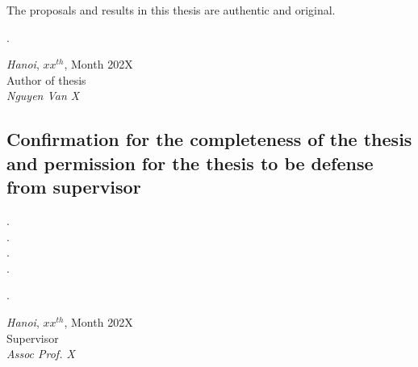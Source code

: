 The proposals and results in this thesis are authentic and original.
\begin{minipage}{0.5\textwidth}
.
\end{minipage}
\begin{minipage}[t]{0.5\textwidth}



\begin{center}
  \textit{Hanoi}, $xx^{th}$, Month 202X\\
  Author of thesis\\[3cm]
  
  \textit{Nguyen Van X}
\end{center}
\end{minipage}
\subsection*{Confirmation for the completeness of the thesis and permission for the thesis to be defense from supervisor}
.\dotfill \\
.\dotfill \\ 
.\dotfill \\ 
.\dotfill \\
\begin{minipage}{0.5\textwidth}
.
\end{minipage}
\begin{minipage}[t]{0.5\textwidth}

\begin{center}
  \textit{Hanoi}, $xx^{th}$, Month 202X\\
  Supervisor\\[3cm]
  
  \textit{Assoc Prof. X}
\end{center}
\end{minipage}

\pagebreak
